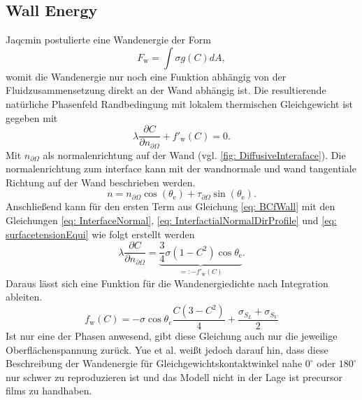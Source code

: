 \subsection{Wall Energy}

Jaqcmin \cite{jacqmin1999CalculationTwoPhaseNavier} postulierte eine Wandenergie der Form
\begin{equation}
    F_{\mathrm{w}}=\int \sigma g(C)dA, 
\end{equation}
womit die Wandenergie nur noch eine Funktion abhängig von der Fluidzusammensetzung direkt an der Wand abhängig ist. Die resultierende natürliche Phasenfeld Randbedingung mit lokalem thermischen Gleichgewicht ist gegeben mit
\begin{equation}
    \label{eq: BCfWall}
    \lambda \frac{\partial C}{\partial n_{\partial \Omega}} + f'_{\mathrm{w}}(C) =0.
\end{equation}
Mit $n_{\partial \Omega}$ als normalenrichtung auf der Wand (vgl. \ref{fig: DiffusiveInteraface}).
Die normalenrichtung zum interface kann mit der wandnormale und wand tangentiale Richtung auf der Wand beschrieben werden. 
\begin{equation}
    \label{eq: InterfaceNormal}
    n=n_{\partial\Omega}\cos{(\theta_{\mathrm{e}})}+\tau_{\partial\Omega}\sin{(\theta_{\mathrm{e}})}.
\end{equation}
Anschließend kann für den ersten Term aus Gleichung \ref{eq: BCfWall} mit den Gleichungen \ref{eq: InterfaceNormal}, \ref{eq: InterfactialNormalDirProfile} und \ref{eq: surfacetensionEqui} wie folgt erstellt werden
\begin{equation}
    \lambda\frac{\partial C}{\partial n_{\partial\Omega}} =\underbrace{\frac{3}{4}\sigma\left(1-C^2\right)\cos\theta_{\mathrm{e}}}_{=:-f'_\mathrm{w}(C)}.
\end{equation}
Daraus lässt sich eine Funktion für die Wandenergiedichte nach Integration ableiten\cite{jacqmin2000ContactlineDynamicsDiffuse}\cite{holzinger2021DirectNumericalSimulation}.
\begin{equation}
    f_{\mathrm{w}}(C)=-\sigma \cos\theta_e \frac{C(3-C^2)}{4} + \frac{\sigma_{S_L}+ \sigma_{S_V}}{2}
\end{equation}
Ist nur eine der Phasen anwesend, gibt diese Gleichung auch nur die jeweilige Oberflächenspannung zurück. Yue et al. \cite{yue2011WallEnergyRelaxation} weißt jedoch darauf hin, dass diese Beschreibung der Wandenergie für Gleichgewichtskontaktwinkel nahe $0^{\circ}$ oder $180^{\circ}$ nur schwer zu reproduzieren ist und das Modell nicht in der Lage ist precursor films zu handhaben. 
